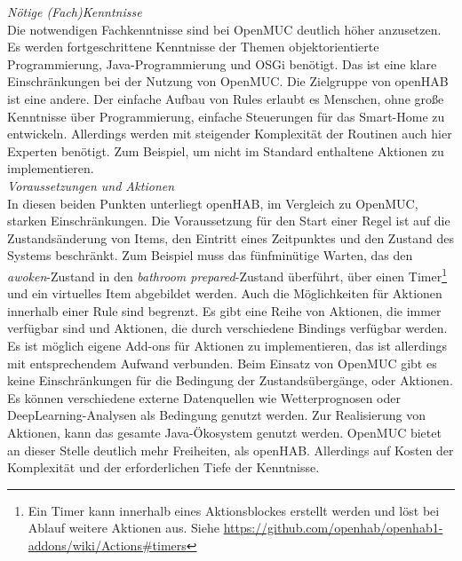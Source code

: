 \textit{Nötige (Fach)Kenntnisse}\\
Die notwendigen Fachkenntnisse sind bei OpenMUC deutlich höher anzusetzen.
Es werden fortgeschrittene Kenntnisse der Themen objektorientierte Programmierung, Java-Programmierung und OSGi benötigt.
Das ist eine klare Einschränkungen bei der Nutzung von OpenMUC.
Die Zielgruppe von openHAB ist eine andere.
Der einfache Aufbau von Rules erlaubt es Menschen, ohne große Kenntnisse über Programmierung, einfache Steuerungen für das Smart-Home zu entwickeln.
Allerdings werden mit steigender Komplexität der Routinen auch hier Experten benötigt.
Zum Beispiel, um nicht im Standard enthaltene Aktionen zu implementieren.\\

\textit{Voraussetzungen und Aktionen}\\
In diesen beiden Punkten unterliegt openHAB, im Vergleich zu OpenMUC, starken Einschränkungen.
Die Voraussetzung für den Start einer Regel ist auf die Zustandsänderung von Items, den Eintritt eines Zeitpunktes und den Zustand des Systems beschränkt.
Zum Beispiel muss das fünfminütige Warten, das den \textit{awoken}-Zustand in den \textit{bathroom prepared}-Zustand überführt,
über einen Timer\footnote{Ein Timer kann innerhalb eines Aktionsblockes erstellt werden und löst bei Ablauf weitere Aktionen aus.
Siehe \url{https://github.com/openhab/openhab1-addons/wiki/Actions\#timers}} und ein virtuelles Item abgebildet werden. 
Auch die Möglichkeiten für Aktionen innerhalb einer Rule sind begrenzt. Es gibt eine Reihe von Aktionen, 
die immer verfügbar sind und Aktionen, die durch verschiedene Bindings verfügbar werden.
Es ist möglich eigene Add-ons für Aktionen zu implementieren, das ist allerdings mit entsprechendem Aufwand verbunden.
Beim Einsatz von OpenMUC gibt es keine Einschränkungen für die Bedingung der Zustandsübergänge, oder Aktionen.
Es können verschiedene externe Datenquellen wie Wetterprognosen oder DeepLearning-Analysen als Bedingung genutzt werden.
Zur Realisierung von Aktionen, kann das gesamte Java-Ökosystem genutzt werden.
OpenMUC bietet an dieser Stelle deutlich mehr Freiheiten, als openHAB.
Allerdings auf Kosten der Komplexität und der erforderlichen Tiefe der Kenntnisse.\\

